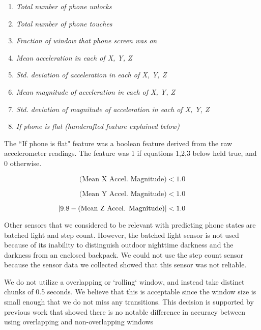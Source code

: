 \begin{enumerate}
\item \textit{Total number of phone unlocks}
\item \textit{Total number of phone touches}
\item \textit{Fraction of window that phone screen was on}
\item \textit{Mean acceleration in each of X, Y, Z}
\item \textit{Std. deviation of acceleration in each of X, Y, Z}
\item \textit{Mean magnitude of acceleration in each of X, Y, Z}
\item \textit{Std. deviation of magnitude of acceleration in each of X, Y, Z}
\item \textit{If phone is flat (handcrafted feature explained below)}
\end{enumerate}

The ``If phone is flat" feature was a boolean feature derived from the raw accelerometer readings. 
The feature was 1 if equations 1,2,3 below held true, and 0 otherwise.

\begin{equation}\label{eq1}
 \text{(Mean X Accel. Magnitude)} < 1.0 
\end{equation}

\begin{equation}\label{eq2}
\text{(Mean Y Accel. Magnitude)} < 1.0
\end{equation}

\begin{equation}\label{eq1}
\hspace*{-1cm}|9.8 - \text{(Mean Z Accel. Magnitude)}| < 1.0
\end{equation}

Other sensors that we considered to be relevant with predicting phone states are batched light and step count.
However, the batched light sensor is not used because of its inability to distinguish outdoor nighttime darkness and the darkness from an enclosed backpack. 
We could not use the step count sensor because the sensor data we collected showed that this sensor was not reliable. 

We do not utilize a overlapping or `rolling` window, and instead take distinct chunks of 0.5 seconds.
We believe that this is acceptable since the window size is small enough that we do not miss any transitions.
This decision is supported by previous work that showed there is no notable difference in accuracy between using overlapping and non-overlapping windows \cite{Martin2013}

